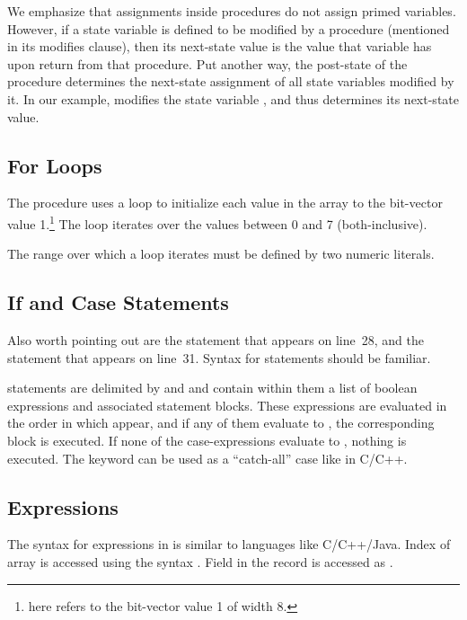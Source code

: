 We emphasize that assignments inside procedures do not assign primed
variables. However, if a state variable is defined to be modified by
a procedure (mentioned in its modifies clause), then its next-state
value is the value that variable has upon return from that procedure.
Put another way, the post-state of the procedure determines the
next-state assignment of all state variables modified by it.
In our example,   modifies
the state variable , and thus determines its next-state
value.


\subsection{For Loops}
The procedure  uses a  loop to initialize each value in the array  to the bit-vector value 1.\footnote{ here refers to the bit-vector value 1 of width 8.} The loop iterates over the values between 0 and 7 (both-inclusive).

The range over which a  loop iterates must be defined by two numeric literals.

\subsection{If and Case Statements}
Also worth pointing out are the  statement that appears on line~28, and the  statement that appears on line~31. Syntax for  statements should be familiar.

 statements are delimited by  and  and contain within them a list of boolean expressions and associated statement blocks. These expressions are evaluated in the order in which appear, and if any of them evaluate to , the corresponding block is executed. If none of the case-expressions evaluate to , nothing is executed. The keyword  can be used as a ``catch-all'' case like in C/C++.

\subsection{Expressions}

The syntax for expressions in \uclid{} is similar to languages like C/C++/Java. Index  of array  is accessed using the syntax . Field  in the record  is accessed as .

